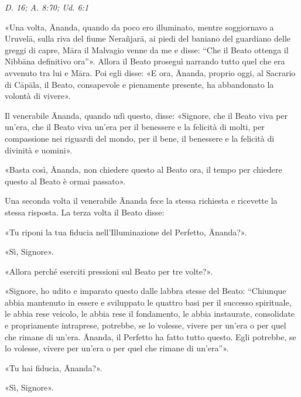 \emph{D. 16; A. 8:70; Ud. 6:1}


«Una volta, Ānanda, quando da poco ero illuminato, mentre soggiornavo a
Uruvelā, sulla riva del fiume Nerañjarā, ai piedi del baniano del
guardiano delle greggi di capre, Māra il Malvagio venne da me e disse:
“Che il Beato ottenga il Nibbāna definitivo ora”». Allora il Beato
proseguì narrando tutto quel che era avvenuto tra lui e Māra. Poi egli
disse: «E ora, Ānanda, proprio oggi, al Sacrario di Cāpāla, il Beato,
consapevole e pienamente presente, ha abbandonato la volontà di vivere».


Il venerabile Ānanda, quando udì questo, disse: «Signore, che il Beato
viva per un’era, che il Beato viva un’era per il benessere e la felicità
di molti, per compassione nei riguardi del mondo, per il bene, il
benessere e la felicità di divinità e uomini».


«Basta così, Ānanda, non chiedere questo al Beato ora, il tempo per
chiedere questo al Beato è ormai passato».


Una seconda volta il venerabile Ānanda fece la stessa richiesta e
ricevette la stessa risposta. La terza volta il Beato disse:


«Tu riponi la tua fiducia nell’Illuminazione del Perfetto, Ānanda?».


«Sì, Signore».


«Allora perché eserciti pressioni sul Beato per tre volte?».


«Signore, ho udito e imparato questo dalle labbra stesse del Beato:
“Chiunque abbia mantenuto in essere e sviluppato le quattro basi per il
successo spirituale, le abbia rese veicolo, le abbia rese il fondamento,
le abbia instaurate, consolidate e propriamente intraprese, potrebbe, se
lo volesse, vivere per un’era o per quel che rimane di un’era. Ānanda,
il Perfetto ha fatto tutto questo. Egli potrebbe, se lo volesse, vivere
per un’era o per quel che rimane di un’era”».


«Tu hai fiducia, Ānanda?».


«Sì, Signore».


